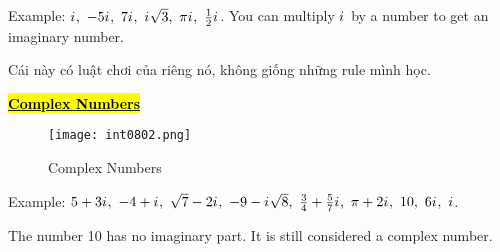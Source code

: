 Example: $\iu,\ -5\iu,\ 7\iu,\ \iu\sqrt{3},\ \pi\iu,\ \frac{1}{2}\iu$. You can multiply ${i\mkern1mu}$ by a number to get an imaginary number.

Cái này có luật chơi của riêng nó, không giống những rule mình học.

\newpage

\centerline{\underline{\textbf{\large \hl{Complex Numbers}}}}

\begin{figure}[htb!]
  \centering
  \texttt{[image: int0802.png]}
  \caption{Complex Numbers}
\end{figure}

Example: $5+3\iu,\ -4+\iu,\ \sqrt{7}-2\iu,\ -9-\iu\sqrt{8},\ \frac{3}{4}+\frac{5}{7}\iu,\ \pi+2\iu,\ 10,\ 6\iu,\ \iu$.

The number 10 has no imaginary part. It is still considered a complex number.

\vspace{.5cm}

